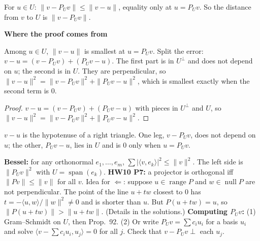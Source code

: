 \documentclass[10pt]{scrartcl}
\newenvironment{fig}{\par\needspace{9\baselineskip}\medskip\begin{center}}{\end{center}\medskip}
\newcommand{\figcap}[1]{\par\vspace{3pt}\begin{minipage}{0.86\linewidth}\small\centering #1\end{minipage}}
\DeclareMathOperator{\nul}{null}
\DeclareMathOperator{\range}{range}
\DeclareMathOperator{\spn}{span}
\newcommand{\ip}[2]{\langle #1,#2\rangle}
\newenvironment{motive}{\begin{mdframed}[style=thinkbox]\textbf{\color{OliveGreen!75!black}Where the proof comes from}\begin{description}[leftmargin=0.9em,labelindent=0pt,itemsep=2pt,topsep=2pt,font=\normalfont\bfseries\color{OliveGreen!70!black}]}{\end{description}\end{mdframed}}
\begin{document}
\begin{proposition*}
  For $u\in U$: $\|v-P_Uv\|\le\|v-u\|$, equality only at $u=P_Uv$. So the distance from $v$ to $U$ is $\|v-P_Uv\|$.
\end{proposition*}
\begin{motive}
  \ii[Want.] Among $u\in U$, $\|v-u\|$ is smallest at $u=P_Uv$.
   Split the error: $v-u=(v-P_Uv)+(P_Uv-u)$. The first part is in $U^\perp$ and does not depend on $u$; the second is in $U$. They are perpendicular, so $\|v-u\|^2=\|v-P_Uv\|^2+\|P_Uv-u\|^2$, which is smallest exactly when the second term is $0$.
\end{motive}
\begin{proof}
  $v-u=(v-P_Uv)+(P_Uv-u)$ with pieces in $U^\perp$ and $U$, so $\|v-u\|^2=\|v-P_Uv\|^2+\|P_Uv-u\|^2$.
\end{proof}
\begin{fig}
\figcap{$v-u$ is the hypotenuse of a right triangle. One leg, $v-P_Uv$, does not depend on $u$; the other, $P_Uv-u$, lies in $U$ and is $0$ only when $u=P_Uv$.}
\end{fig}

\begin{itemize}
  \ii \textbf{Bessel:} for any orthonormal $e_1,\dots,e_m$, $\sum|\ip v{e_k}|^2\le\|v\|^2$. The left side is $\|P_Uv\|^2$ with $U=\spn(e_k)$.
  \ii \textbf{HW10 P7:} a projector is orthogonal iff $\|Pv\|\le\|v\|$ for all $v$. Idea for $\Leftarrow$: suppose $u\in\range P$ and $w\in\nul P$ are not perpendicular. The point of the line $u+tw$ closest to $0$ has $t=-\ip uw/\|w\|^2\ne0$ and is shorter than $u$. But $P(u+tw)=u$, so $\|P(u+tw)\|>\|u+tw\|$. (Details in the solutions.)
  \ii \textbf{Computing $P_Uv$:} (1) Gram--Schmidt on $U$, then Prop.~92. (2) Or write $P_Uv=\sum c_iu_i$ for a basis $u_i$ and solve $\ip{v-\sum c_iu_i}{u_j}=0$ for all $j$. Check that $v-P_Uv\perp$ each $u_j$.
\end{itemize}
\end{document}
